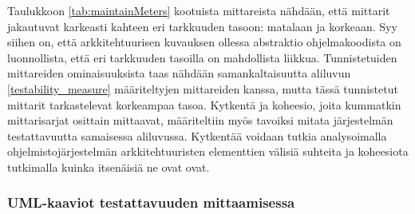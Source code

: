 \documentclass[finnish]{tktltiki2}
\numberwithin{table}{section}
\theoremstyle{definition}
\theoremstyle{remark}
\begin{document}
\begin{table}[H]
	\centering
	\setlength{\extrarowheight}{4pt}%
\end{table}


\noindent
Taulukkoon \ref{tab:maintainMeters} kootuista mittareista nähdään, että mittarit jakautuvat karkeasti kahteen eri tarkkuuden tasoon: matalaan ja korkeaan. Syy siihen on, että arkkitehtuurisen kuvauksen ollessa abstraktio ohjelmakoodista on luonnollista, että eri tarkkuuden tasoilla on mahdollista liikkua. Tunnistetuiden mittareiden ominaisuuksista taas nähdään samankaltaisuutta aliluvun \ref{testability_measure} määriteltyjen mittareiden kanssa, mutta tässä tunnistetut mittarit tarkastelevat korkeampaa tasoa. Kytkentä ja koheesio, joita kummatkin mittarisarjat osittain mittaavat, määriteltiin myös tavoiksi mitata järjestelmän testattavuutta samaisessa aliluvussa. Kytkentää voidaan tutkia analysoimalla ohjelmistojärjestelmän arkkitehtuuristen elementtien välisiä suhteita ja koheesiota tutkimalla kuinka itsenäisiä ne ovat ovat.

\subsubsection{UML-kaaviot testattavuuden mittaamisessa} \label{uml_arch_test}
\end{document}
